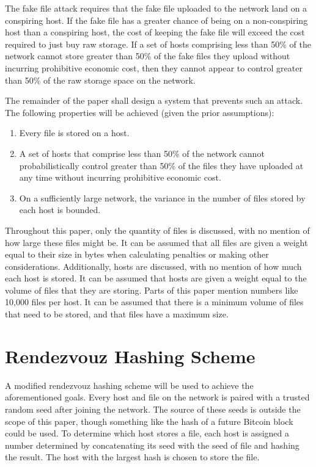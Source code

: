 \documentclass[twocolumn]{article}
\begin{document}
The fake file attack requires that the fake file uploaded to the network land on a conspiring host.
If the fake file has a greater chance of being on a non-conspiring host than a conspiring host, the cost of keeping the fake file will exceed the cost required to just buy raw storage.
If a set of hosts comprising less than 50\% of the network cannot store greater than 50\% of the fake files they upload without incurring prohibitive economic cost, then they cannot appear to control greater than 50\% of the raw storage space on the network.

The remainder of the paper shall design a system that prevents such an attack. The following properties will be achieved (given the prior assumptions):
\begin{enumerate}
	\item Every file is stored on a host.
	\item A set of hosts that comprise less than 50\% of the network cannot probabilistically control greater than 50\% of the files they have uploaded at any time without incurring prohibitive economic cost.
	\item On a sufficiently large network, the variance in the number of files stored by each host is bounded.
\end{enumerate}

Throughout this paper, only the quantity of files is discussed, with no mention of how large these files might be.
It can be assumed that all files are given a weight equal to their size in bytes when calculating penalties or making other considerations.
Additionally, hosts are discussed, with no mention of how much each host is stored.
It can be assumed that hosts are given a weight equal to the volume of files that they are storing.
Parts of this paper mention numbers like 10,000 files per host.
It can be assumed that there is a minimum volume of files that need to be stored, and that files have a maximum size.

\section{Rendezvouz Hashing Scheme}
A modified rendezvouz hashing scheme will be used to achieve the aforementioned goals.
Every host and file on the network is paired with a trusted random seed after joining the network.
The source of these seeds is outside the scope of this paper, though something like the hash of a future Bitcoin block could be used.
To determine which host stores a file, each host is assigned a number determined by concatenating its seed with the seed of file and hashing the result.
The host with the largest hash is chosen to store the file.
\end{document}

